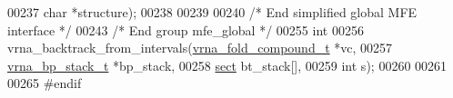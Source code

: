 \begin{DoxyCode}
00237             \textcolor{keywordtype}{char}        *structure);
00238 
00239 
00240 \textcolor{comment}{/* End simplified global MFE interface */}
00243 \textcolor{comment}{/* End group mfe\_global */}
00255 \textcolor{keywordtype}{int}
00256 vrna\_backtrack\_from\_intervals(\hyperlink{group__fold__compound_structvrna__fc__s}{vrna\_fold\_compound\_t}  *vc,
00257                               \hyperlink{group__data__structures_structvrna__bp__stack__s}{vrna\_bp\_stack\_t}       *bp\_stack,
00258                               \hyperlink{group__data__structures_structvrna__sect__s}{sect}                  bt\_stack[],
00259                               \textcolor{keywordtype}{int}                   s);
00260 
00261 
00265 \textcolor{preprocessor}{#endif}
\end{DoxyCode}
